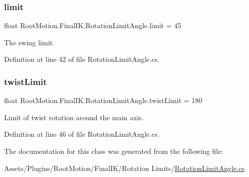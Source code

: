 \subsubsection{\texorpdfstring{limit}{limit}}
{\footnotesize\ttfamily float Root\+Motion.\+Final\+I\+K.\+Rotation\+Limit\+Angle.\+limit = 45}



The swing limit. 



Definition at line 42 of file Rotation\+Limit\+Angle.\+cs.

\mbox{\label{class_root_motion_1_1_final_i_k_1_1_rotation_limit_angle_a7d32cd3594187cae31d86845fbd4d3f8}} 
\subsubsection{\texorpdfstring{twist\+Limit}{twistLimit}}
{\footnotesize\ttfamily float Root\+Motion.\+Final\+I\+K.\+Rotation\+Limit\+Angle.\+twist\+Limit = 180}



Limit of twist rotation around the main axis. 



Definition at line 46 of file Rotation\+Limit\+Angle.\+cs.



The documentation for this class was generated from the following file\+:\begin{DoxyCompactItemize}
\item 
Assets/\+Plugins/\+Root\+Motion/\+Final\+I\+K/\+Rotation Limits/\mbox{\hyperlink{_rotation_limit_angle_8cs}{Rotation\+Limit\+Angle.\+cs}}\end{DoxyCompactItemize}
